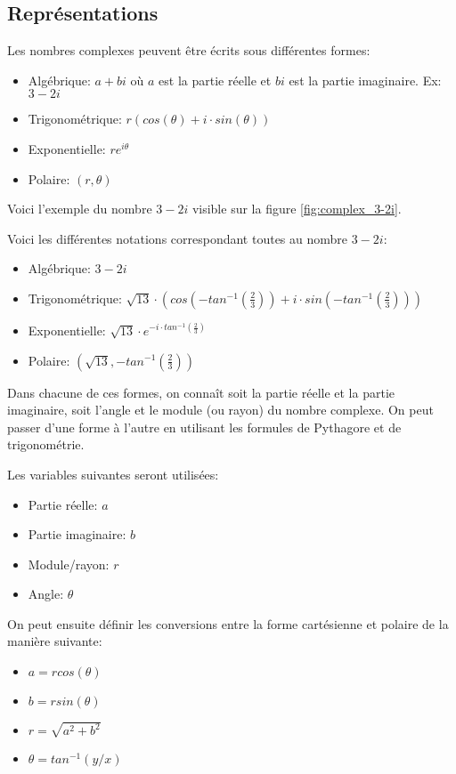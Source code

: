 \subsection{Représentations}
\label{sec:complex_representations}

Les nombres complexes peuvent être écrits sous différentes formes:
\begin{itemize}
    \item Algébrique: $a + bi$ où $a$ est la partie réelle et $bi$ est la partie imaginaire. Ex: $3 - 2i$
    \item Trigonométrique: $r(cos(\theta) + i \cdot sin(\theta))$
    \item Exponentielle: $re^{i\theta}$
    \item Polaire: $(r, \theta)$
\end{itemize}

Voici l'exemple du nombre $3 - 2i$ visible sur la figure \ref{fig:complex_3-2i}.

\begin{minipage}{\linewidth}
\label{fig:complex_3-2i}
\end{minipage}

Voici les différentes notations correspondant toutes au nombre $3 - 2i$:
\begin{itemize}
    \item Algébrique: $3 - 2i$
    \item Trigonométrique: $\sqrt{13} \cdot (cos(-tan^{-1}(\frac{2}{3})) + i \cdot sin(-tan^{-1}(\frac{2}{3})))$
    \item Exponentielle: $\sqrt{13} \cdot e^{-i \cdot tan^{-1}(\frac{2}{3})}$
    \item Polaire: $(\sqrt{13}, -tan^{-1}(\frac{2}{3}))$
\end{itemize}

Dans chacune de ces formes, on connaît soit la partie réelle et la partie imaginaire, soit l'angle et le module (ou rayon) du nombre complexe. On peut passer d'une forme à l'autre en utilisant les formules de Pythagore et de trigonométrie.

Les variables suivantes seront utilisées:
\begin{itemize}
    \item Partie réelle: $a$
    \item Partie imaginaire: $b$
    \item Module/rayon: $r$
    \item Angle: $\theta$
\end{itemize}

On peut ensuite définir les conversions entre la forme cartésienne et polaire de la manière suivante:
\begin{itemize}
    \item $a = r cos(\theta)$
    \item $b = r sin(\theta)$
    \item $r = \sqrt{a^2 + b^2}$
    \item $\theta = tan^{-1}(y/x)$
\end{itemize}
